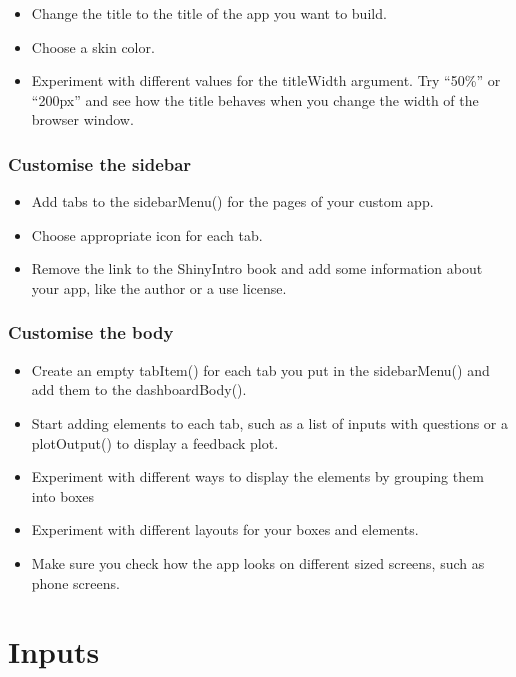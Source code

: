 \documentclass[
]{book}
\providecommand{\tightlist}{%
  \setlength{\itemsep}{0pt}\setlength{\parskip}{0pt}}
\begin{document}
\begin{itemize}
\tightlist
\item
  Change the title to the title of the app you want to build.
\item
  Choose a skin color.
\item
  Experiment with different values for the titleWidth argument. Try ``50\%'' or ``200px'' and see how the title behaves when you change the width of the browser window.
\end{itemize}

\hypertarget{customise-the-sidebar}{%
\subsection{Customise the sidebar}\label{customise-the-sidebar}}

\begin{itemize}
\tightlist
\item
  Add tabs to the sidebarMenu() for the pages of your custom app.
\item
  Choose appropriate icon for each tab.
\item
  Remove the link to the ShinyIntro book and add some information about your app, like the author or a use license.
\end{itemize}

\hypertarget{customise-the-body}{%
\subsection{Customise the body}\label{customise-the-body}}

\begin{itemize}
\tightlist
\item
  Create an empty tabItem() for each tab you put in the sidebarMenu() and add them to the dashboardBody().
\item
  Start adding elements to each tab, such as a list of inputs with questions or a plotOutput() to display a feedback plot.
\item
  Experiment with different ways to display the elements by grouping them into boxes
\item
  Experiment with different layouts for your boxes and elements.
\item
  Make sure you check how the app looks on different sized screens, such as phone screens.
\end{itemize}

\hypertarget{inputs}{%
\chapter{Inputs}\label{inputs}}
\end{document}
